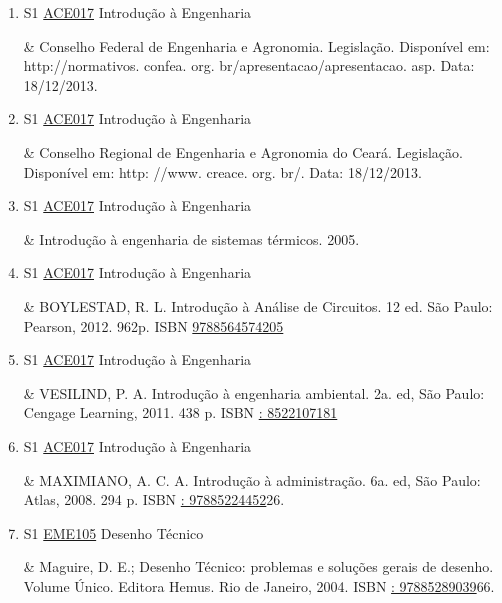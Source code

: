 \documentclass[12pt,a4paper]{book}
\begin{document}
\begin{enumerate}
& Instituto Federal de Educação, Ciência e Tecnologia do Ceará.  Regulamento da Organização Didática.  Fortaleza: IFCE, 2010.  p.  64.  Disponível em: \url{http://www. ifce. edu. br/images/stories/menu_superior/Ensino/ROD/ROD-Comisso_de_Sistematizao27. pdf}.  Data: 18/12/2013.
 \item S1 \hyperref[PUD:ACE017]{ACE017} Introdução à Engenharia

&  Conselho Federal de Engenharia e Agronomia.  Legislação.  Disponível em: http://normativos. 
confea. org. br/apresentacao/apresentacao. asp.  Data: 18/12/2013. 
 

 \item S1 \hyperref[PUD:ACE017]{ACE017} Introdução à Engenharia

&  Conselho Regional de Engenharia e Agronomia do Ceará.  Legislação.  Disponível em: http:
//www. creace. org. br/.  Data: 18/12/2013. 
 

 \item S1 \hyperref[PUD:ACE017]{ACE017} Introdução à Engenharia

&  Introdução à engenharia de sistemas térmicos.  2005. 
 

 \item S1 \hyperref[PUD:ACE017]{ACE017} Introdução à Engenharia

&  BOYLESTAD, R.  L.  Introdução à Análise de Circuitos.  12 ed.  São Paulo: Pearson, 2012.  962p.  ISBN \href{http://www.bn.br/site/pages/servicosProfissionais/agenciaISBN/isbnBusca/FbnBuscaISBNCatalogo.asp?pField=ISBN&pIntPagina=1&pISBN=64574205&nidbISBN=true&hidbISBN=true}{9788564574205}
 

 \item S1 \hyperref[PUD:ACE017]{ACE017} Introdução à Engenharia

&  VESILIND, P.  A.  Introdução à engenharia ambiental.  2a.  ed, São Paulo: Cengage Learning, 2011.  438 p.  ISBN \href{http://www.google.com/search?hl=pt-BR&tbo=p&tbm=bks&q=isbn:: 8522107181&num=10}{: 8522107181}
 

 \item S1 \hyperref[PUD:ACE017]{ACE017} Introdução à Engenharia

&  MAXIMIANO, A.  C.  A.  Introdução à administração.  6a.  ed, São Paulo: Atlas, 2008.  294 p.  ISBN \href{http://www.google.com/search?hl=pt-BR&tbo=p&tbm=bks&q=isbn:: 97885224452&num=10}{: 97885224452}26.
 \item S1 \hyperref[PUD:EME105]{EME105} Desenho Técnico

& Maguire, D. E.;  Desenho Técnico: problemas e soluções gerais de desenho.  Volume Único.  Editora Hemus.  Rio de Janeiro, 2004.  ISBN \href{http://www.google.com/search?hl=pt-BR&tbo=p&tbm=bks&q=isbn:: 97885289039&num=10}{: 97885289039}66. 


\end{enumerate}
\end{document}
